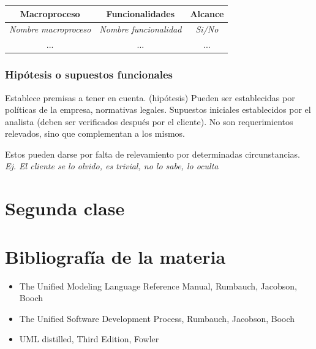 \documentclass[titlepage,a4paper]{article}
\begin{document}
\begin{table}[]
\begin{center}
\begin{tabular}{|l|l|c|}
\hline
\multicolumn{1}{|c|}{Macroproceso} & \multicolumn{1}{c|}{Funcionalidades} & Alcance \\ \hline
\textit{Nombre macroproceso}      & \textit{Nombre funcionalidad}       & \textit{Si/No} \\ \hline
 \multicolumn{1}{|c|}{...}          & \multicolumn{1}{c|}{...}            & ...            \\ \hline
\end{tabular}
\end{center}
\end{table}


\subsubsection*{Hipótesis o supuestos funcionales}
Establece premisas a tener en cuenta. (hipótesis)
Pueden ser establecidas por políticas de la empresa, normativas legales. Supuestos iniciales establecidos por el analista (deben ser verificados después por el cliente). No son requerimientos relevados, sino que complementan a los mismos.

Estos pueden darse por falta de relevamiento por determinadas circunstancias. \textit{Ej. El cliente se lo olvido, es trivial, no lo sabe, lo oculta}


\section*{Segunda clase}



\section{Bibliografía de la materia}

\begin{itemize}
    \item The Unified Modeling Language Reference Manual, Rumbauch, Jacobson, Booch
    \item The Unified Software Development Process, Rumbauch, Jacobson, Booch
    \item UML distilled, Third Edition, Fowler
\end{itemize}
\end{document}
